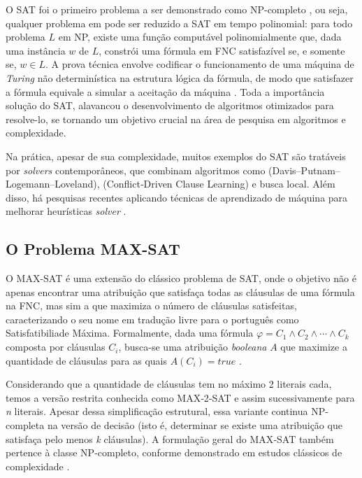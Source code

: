 O SAT foi o primeiro problema a ser demonstrado como NP-completo \cite{cook2023complexity}, ou seja, qualquer problema em  pode ser reduzido a SAT em tempo polinomial: para todo problema \( L \) em NP, existe uma função computável polinomialmente que, dada uma instância \( w \) de \( L \), constrói uma fórmula em FNC satisfazível se, e somente se, \( w \in L \). A prova técnica envolve codificar o funcionamento de uma máquina de \textit{Turing} não determinística na estrutura lógica da fórmula, de modo que satisfazer a fórmula equivale a simular a aceitação da máquina \cite{Cook_Levin-AFP}. Toda a importância solução do SAT, alavancou o desenvolvimento de algoritmos otimizados para resolve-lo, se tornando um objetivo crucial na área de pesquisa em algoritmos e complexidade. 

Na prática, apesar de sua complexidade, muitos exemplos do SAT são tratáveis por \textit{solvers} contemporâneos, que combinam algoritmos como  (Davis–Putnam–Logemann–Loveland),  (Conflict‑Driven Clause Learning) e busca local. Além disso, há pesquisas recentes aplicando técnicas de aprendizado de máquina para melhorar heurísticas \textit{solver} \cite{guo2023machine}.

\subsection{O Problema MAX-SAT}

O MAX-SAT é uma extensão do clássico problema de SAT, onde o objetivo não é apenas encontrar uma atribuição que satisfaça todas as cláusulas de uma fórmula na FNC, mas sim a que maximiza o número de cláusulas satisfeitas, caracterizando o seu nome em tradução livre para o português como Satisfatibiliade Máxima. Formalmente, dada uma fórmula \( \varphi = C_1 \land C_2 \land \cdots \land C_k \) composta por cláusulas \( C_i \), busca-se uma atribuição \textit{booleana} \( A \) que maximize a quantidade de cláusulas para as quais \( A(C_i) = \textit{true} \) \cite{el2016computational}. 

Considerando que a quantidade de cláusulas tem no máximo 2 literais cada, temos a versão restrita conhecida como MAX‑2‑SAT e assim sucessivamente para \textit{n} literais. Apesar dessa simplificação estrutural, essa variante continua NP-completa na versão de decisão (isto é, determinar se existe uma atribuição que satisfaça pelo menos \textit{k} cláusulas). A formulação geral do MAX‑SAT também pertence à classe NP-completo, conforme demonstrado em estudos clássicos de complexidade \cite{krentel1986complexity}.

